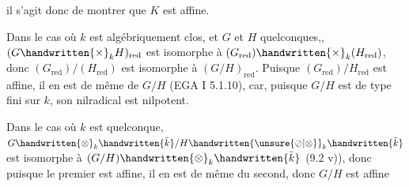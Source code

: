 
il s'agit donc de montrer que $K$ est affine.


Dans le cas où $k$ est algébriquement clos, et $G$ et $H$ quelconques,, $(G\handwritten{\times}_k H)_{\mathrm{red}}$ est isomorphe à $(G_{\mathrm{red}})\handwritten{\times}_k(H_{\mathrm{red}})$, donc $(G_{\mathrm{red}})/(H_{\mathrm{red}})$ est isomorphe à $(G/H)_{\mathrm{red}}$. Puisque $(G_{\mathrm{red}})/H_{\mathrm{red}}$ est affine, il en est de même de $G/H$ (EGA I 5.1.10), car, puisque $G/H$ est de type fini sur $k$, son nilradical est nilpotent.

Dans le cas où $k$ est quelconque, $G\handwritten{\otimes}_k\handwritten{\bar{k}}/H\handwritten{\unsure{\oslash|\otimes}}_k\handwritten{\bar{k}}$ est isomorphe à $(G/H)\handwritten{\otimes}_k\handwritten{\bar{k}}$ (9.2 v)), donc puisque le premier est affine, il en est de même du second, donc $G/H$ est affine
\margin{\handwritten{(\qquad)}}

